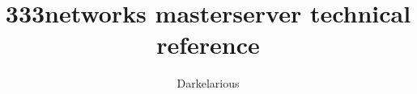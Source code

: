 

\usepackage[english]{babel}
\usepackage{anonchap}
\usepackage[left=3cm,top=3cm,right=3cm,bottom=3cm]{geometry}
\usepackage{fancyhdr}
\usepackage[x11names]{xcolor}
\usepackage{hyphenat} 
\usepackage[pdftex]{graphicx}
\usepackage{float}
\usepackage{wrapfig}
\usepackage{enumerate}
\usepackage{listings}
\usepackage{verbatim}
\usepackage{caption}
\usepackage{multirow}
\usepackage{appendix}
\usepackage{tikz}
\usepackage{pgf}
\usepackage{url}
\usepackage[super,square,comma]{natbib}
\usepackage{hyperref}
\usepackage{amsmath}

\title{333networks masterserver technical reference}
\author{Darkelarious}

\usetikzlibrary{shapes,arrows,angles, calc}

\simplechapter

\newcommand{\HRule}{\rule{\linewidth}{0.1mm}}
\renewcommand{\simplechapterdelim}{.}
\renewcommand{\chaptermark}[1]{\markboth{#1}{}}


\pagestyle{fancyplain}
\setlength{\headheight}{14pt}
\fancyhf[LH]{\nouppercase\leftmark}
\fancyhf[CH]{}
\fancyhf[CF]{}
\fancyhf[RF]{\thepage{}}
\renewcommand{\headrulewidth}{0pt}
\renewcommand{\footrulewidth}{0pt}



\hypersetup{
  colorlinks=true,
  linkcolor=black,
  citecolor=SpringGreen4,
  filecolor=darkgray,
  urlcolor=blue
} 



